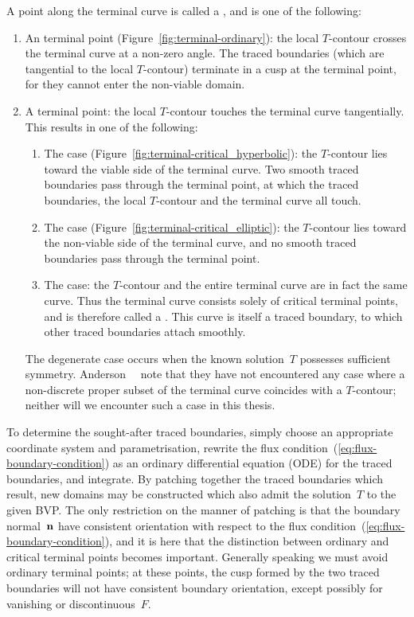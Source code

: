 A point along the terminal curve is called a ,
and is one of the following:
\begin{enumerate}
  \item
    An  terminal point
    (Figure~\ref{fig:terminal-ordinary}):
    the local $T$-contour crosses the terminal curve at a non-zero angle.
    The traced boundaries (which are tangential to the local $T$-contour)
    terminate in a cusp at the terminal point,
    for they cannot enter the non-viable domain.
  \item
    A  terminal point:
    the local $T$-contour touches the terminal curve tangentially.
    This results in one of the following:
    \begin{enumerate}[tightlist]
      \item
        The  case
        (Figure~\ref{fig:terminal-critical_hyperbolic}):
        the $T$-contour lies toward the viable side of the terminal curve.
        Two smooth traced boundaries pass through the terminal point,
        at which the traced boundaries,
        the local $T$-contour and the terminal curve
        all touch.
      \item
        The  case
        (Figure~\ref{fig:terminal-critical_elliptic}):
        the $T$-contour lies toward the non-viable side of the terminal curve,
        and no smooth traced boundaries pass through the terminal point.
      \item
        The  case:
        the $T$-contour and the entire terminal curve
        are in fact the same curve.
        Thus the terminal curve consists solely of critical terminal points,
        and is therefore called a .
        This curve is itself a traced boundary,
        to which other traced boundaries attach smoothly.
    \end{enumerate}
    The degenerate case occurs
    when the known solution~$T$ possesses sufficient symmetry.
    Anderson~\etal~\cite{anderson-2007-boundary-tracing-i-theory}
    note that they have not encountered any case
    where a non-discrete proper subset of the terminal curve
    coincides with a $T$-contour;
    neither will we encounter such a case in this thesis.
\end{enumerate}

To determine the sought-after traced boundaries,
simply choose an appropriate coordinate system and parametrisation,
rewrite the flux condition~(\ref{eq:flux-boundary-condition})
as an ordinary differential equation (ODE) for the traced boundaries,
and integrate.
By patching together the traced boundaries which result,
new domains may be constructed
which also admit the solution~$T$ to the given BVP\@.
The only restriction on the manner of patching
is that the boundary normal~$\mathop{}\!\boldsymbol{\mathbf{n}}$ have consistent orientation
with respect to the flux condition~(\ref{eq:flux-boundary-condition}),
and it is here that
the distinction between ordinary and critical terminal points
becomes important.
Generally speaking we must avoid ordinary terminal points;
at these points,
the cusp formed by the two traced boundaries
will not have consistent boundary orientation,
except possibly for vanishing or discontinuous~$F$.

